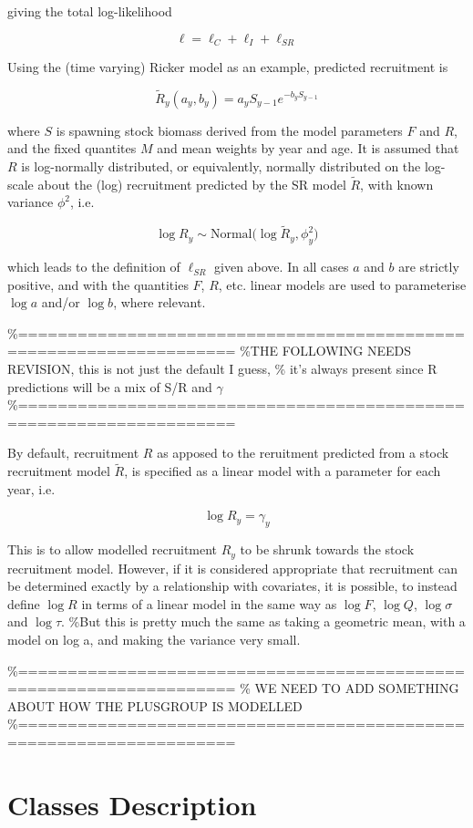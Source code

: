 \documentclass[
]{book}
\begin{document}
giving the total log-likelihood

\[\ell = \ell_C + \ell_I + \ell_{SR}\]

Using the (time varying) Ricker model as an example, predicted recruitment is

\[\tilde{R}_y(a_y,b_y) = a_y S_{y-1} e^{-b_y S_{y-1}}\]

where \(S\) is spawning stock biomass derived from the model parameters \(F\) and \(R\), and the fixed quantites \(M\) and mean weights by year and age. It is assumed that \(R\) is log-normally distributed, or equivalently, normally distributed on the log-scale about the (log) recruitment predicted by the SR model \(\tilde{R}\), with known variance \(\phi^2\), i.e.

\[\log R_y \sim \text{Normal} \Big( \log \tilde{R}_y, \phi_y^2 \Big)\]

which leads to the definition of \(\ell_{SR}\) given above. In all cases \(a\) and \(b\) are strictly positive, and with the quantities \(F\), \(R\), etc. linear models are used to parameterise \(\log a\) and/or \(\log b\), where relevant.

\%====================================================================
\%THE FOLLOWING NEEDS REVISION, this is not just the default I guess,
\% it's always present since R predictions will be a mix of S/R and \(\gamma\)
\%====================================================================

By default, recruitment \(R\) as apposed to the reruitment predicted from a stock recruitment model \(\tilde{R}\), is specified as a linear model with a parameter for each year, i.e.

\[\log R_y = \gamma_y\]

This is to allow modelled recruitment \(R_y\) to be shrunk towards the stock recruitment model. However, if it is considered appropriate that recruitment can be determined exactly by a relationship with covariates, it is possible, to instead define \(\log R\) in terms of a linear model in the same way as \(\log F\), \(\log Q\), \(\log \sigma\) and \(\log \tau\). \%But this is pretty much the same as taking a geometric mean, with a model on log a, and making the variance very small.

\%====================================================================
\% WE NEED TO ADD SOMETHING ABOUT HOW THE PLUSGROUP IS MODELLED
\%====================================================================

\hypertarget{classes-description}{%
\section{\texorpdfstring{Classes Description \label{sec:classes}}{Classes Description }}\label{classes-description}}
\end{document}
